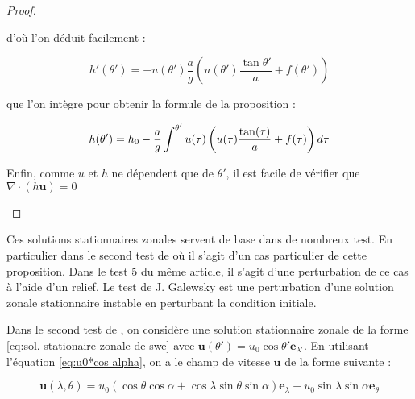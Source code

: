 \begin{proof}
\begin{itemize}
d'où l'on déduit facilement :

\begin{equation}
h'(\theta') = - u(\theta') \dfrac{a}{g} \left( u(\theta') \dfrac{\tan \theta'}{a} + f(\theta') \right)
\end{equation}

que l'on intègre pour obtenir la formule de la proposition :

\begin{equation}
h(\theta') = h_0 - \dfrac{a}{g} \displaystyle\int^{\theta'} u(\tau) \left( u(\tau) \dfrac{\tan (\tau)}{a} + f(\tau) \right) d\tau
\end{equation}

Enfin, comme $u$ et $h$ ne dépendent que de $\theta'$, il est facile de vérifier que $\nabla \cdot \left( h \mathbf{u} \right)=0$
\end{itemize}
\end{proof}

Ces solutions stationnaires zonales servent de base dans de nombreux test. En particulier dans le second test de \cite{Williamson1992} où il s'agit d'un cas particulier de cette proposition. Dans le test 5 du même article, il s'agit d'une perturbation de ce cas à l'aide d'un relief.
Le test de J. Galewsky \cite{Galewsky2004} est une perturbation d'une solution zonale stationnaire instable en perturbant la condition initiale.





















Dans le second test de \cite{Williamson1992}, on considère une solution stationnaire zonale de la forme \eqref{eq:sol. stationaire zonale de swe} avec $\mathbf{u}(\theta')=u_0 \cos \theta' \mathbf{e}_{\lambda'}$. En utilisant l'équation \eqref{eq:u0*cos alpha}, on a le champ de vitesse $\mathbf{u}$ de la forme suivante :

\begin{equation}
\mathbf{u}(\lambda, \theta) = u_0 \left( \cos \theta \cos \alpha + \cos \lambda \sin \theta \sin \alpha \right) \mathbf{e}_{\lambda} - u_0 \sin \lambda \sin \alpha \mathbf{e}_{\theta}
\label{eq: williamson 2 initial velocity}
\end{equation} 

